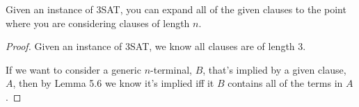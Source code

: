 \documentclass[manuscript]{acmart}
\begin{document}


            
            
            



    \begin{lemma}
        Given an instance of 3SAT, you can expand all of the given clauses
        to the point where you are considering clauses of length $n$.
    \end{lemma}
    \begin{proof}
        Given an instance of 3SAT, we know all clauses are of length 3.

        If we want to consider a generic $n$-terminal, $B$, that's implied by a
        given clause, $A$, then by Lemma 5.6 we know it's implied iff it $B$ 
        contains all of the terms in $A$.
    \end{proof}
\end{document}
